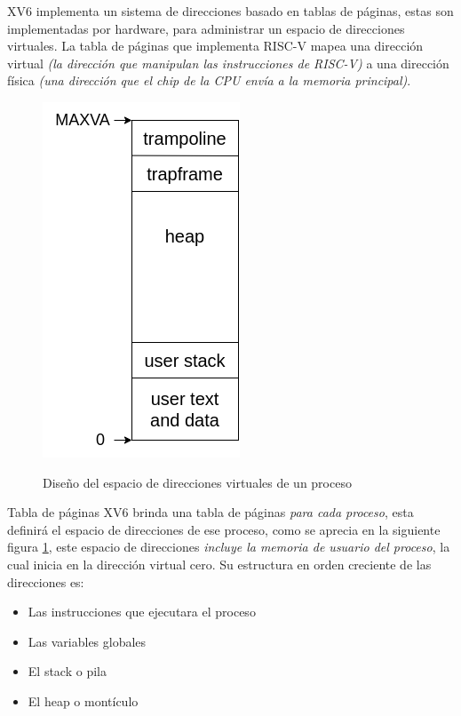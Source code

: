 \documentclass{libs/ufc_format}
\begin{document}
\begin{frame}
  XV6 implementa un sistema de direcciones basado en tablas de páginas, estas son implementadas por hardware, para administrar un espacio de direcciones virtuales. La tabla de páginas que implementa RISC-V mapea una dirección virtual \emph{(la dirección que manipulan las instrucciones de RISC-V)} a una dirección física \emph{(una dirección que el chip de la CPU envía a la memoria principal)}.\cite{xv6_book}
  \begin{figure}
    \centering
    \caption{Diseño del espacio de direcciones virtuales de un proceso}
    \includegraphics[scale=0.28]{libs/img/as.png}
    \label{fig:Espacio_Direcciones}
  \end{figure}
\end{frame}
\begin{frame}{Tabla de páginas}
  XV6 brinda una tabla de páginas \emph{para cada proceso}, esta definirá el espacio de direcciones de ese proceso, como se aprecia en la siguiente figura \ref{fig:Espacio_Direcciones}, este espacio de direcciones \emph{incluye la memoria de usuario del proceso}, la cual inicia en la dirección virtual cero. Su estructura en orden creciente de las direcciones es:

  \vspace{0.3cm}

  \begin{itemize}
    \item Las instrucciones que ejecutara el proceso
    \item Las variables globales
    \item El stack o pila
    \item El heap o montículo
  \end{itemize}
\end{frame}
\end{document}

